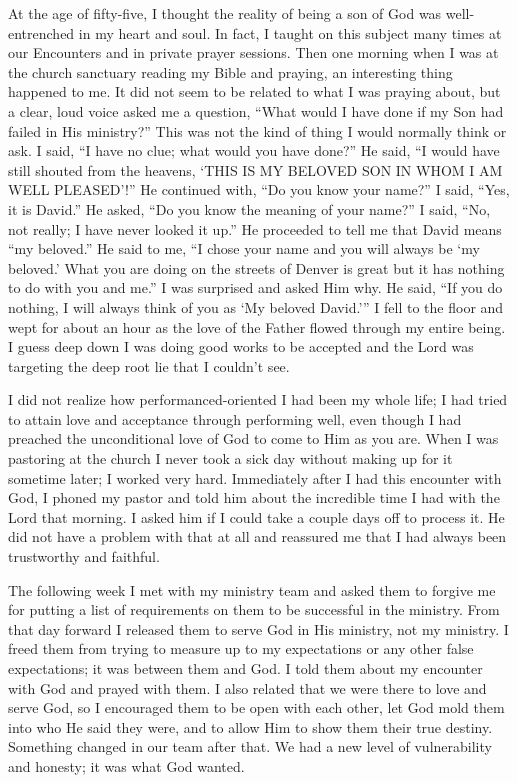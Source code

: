 \documentclass[oneside]{book}
\begin{document}
At the age of fifty-five, I thought the reality of being a son of God was well-entrenched in my heart and soul. In fact, I taught on this subject many times at our Encounters and in private prayer sessions. Then one morning when I was at the church sanctuary reading my Bible and praying, an interesting thing happened to me. It did not seem to be related to what I was praying about, but a clear, loud voice asked me a question, “What would I have done if my Son had failed in His ministry?” This was not the kind of thing I would normally think or ask. I said, “I have no clue; what would you have done?” He said, “I would have still shouted from the heavens, ‘THIS IS MY BELOVED SON IN WHOM I AM WELL PLEASED’!” He continued with, “Do you know your name?” I said, “Yes, it is David.” He asked, “Do you know the meaning of your name?” I said, “No, not really; I have never looked it up.” He proceeded to tell me that David means “my beloved.” He said to me, “I chose your name and you will always be ‘my beloved.’ What you are doing on the streets of Denver is great but it has nothing to do with you and me.” I was surprised and asked Him why. He said, “If you do nothing, I will always think of you as ‘My beloved David.’” I fell to the floor and wept for about an hour as the love of the Father flowed through my entire being. I guess deep down I was doing good works to be accepted and the Lord was targeting the deep root lie that I couldn’t see.

I did not realize how performanced-oriented I had been my whole life; I had tried to attain love and acceptance through performing well, even though I had preached the unconditional love of God to come to Him as you are. When I was pastoring at the church I never took a sick day without making up for it sometime later; I worked very hard. Immediately after I had this encounter with God, I phoned my pastor and told him about the incredible time I had with the Lord that morning. I asked him if I could take a couple days off to process it. He did not have a problem with that at all and reassured me that I had always been trustworthy and faithful.

The following week I met with my ministry team and asked them to forgive me for putting a list of requirements on them to be successful in the ministry. From that day forward I released them to serve God in His ministry, not my ministry. I freed them from trying to measure up to my expectations or any other false expectations; it was between them and God. I told them about my encounter with God and prayed with them. I also related that we were there to love and serve God, so I encouraged them to be open with each other, let God mold them into who He said they were, and to allow Him to show them their true destiny. Something changed in our team after that. We had a new level of vulnerability and honesty; it was what God wanted. 
\end{document}
